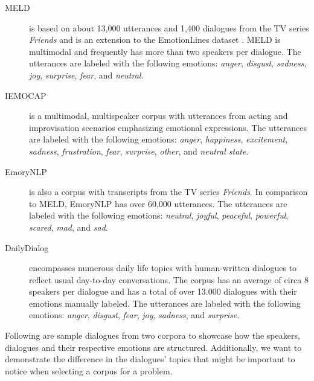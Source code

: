 \documentclass[nofilelist]{cslthse-msc}
\begin{document}


\begin{description}
    \item[MELD] \citep{poria2019meld} is based on about 13,000 utterances and 1,400 dialogues from the TV series \textit{Friends} and is an extension to the EmotionLines dataset \citep{chen2018emotionlines}. MELD is multimodal and  frequently has more than two speakers per dialogue. The utterances are labeled with the following emotions: \textit{anger}, \textit{disgust}, \textit{sadness}, \textit{joy}, \textit{surprise}, \textit{fear}, and \textit{neutral}.

    \item[IEMOCAP] \citep{busso2008iemocap} is a multimodal, multispeaker corpus with utterances from acting and improvisation scenarios emphasizing emotional expressions. The utterances are labeled with the following emotions: \textit{anger}, \textit{happiness}, \textit{excitement}, \textit{sadness}, \textit{frustration}, \textit{fear}, \textit{surprise}, \textit{other}, and \textit{neutral state}.
    
    \item[EmoryNLP] \citep{zahiri2017emoryNLP} is also a corpus with transcripts from the TV series \textit{Friends}. In comparison to MELD, EmoryNLP has over 60,000 utterances. The utterances are labeled with the following emotions: \textit{neutral}, \textit{joyful}, \textit{peaceful}, \textit{powerful}, \textit{scared}, \textit{mad}, and \textit{sad}.
    
    \item[DailyDialog] \citep{lietal2017dailydialog} encompasses numerous daily life topics with human-written dialogues to reflect usual day-to-day conversations. The corpus has an average of circa 8 speakers per dialogue and has a total of over 13.000 dialogues with their emotions manually labeled. The utterances are labeled with the following emotions: \textit{anger}, \textit{disgust}, \textit{fear}, \textit{joy}, \textit{sadness}, and \textit{surprise}.
\end{description}


Following are sample dialogues from two corpora to showcase how the speakers, dialogues and their respective emotions are structured. Additionally, we want to demonstrate the difference in the dialogues' topics that might be important to notice when selecting a corpus for a problem. 
\end{document}
